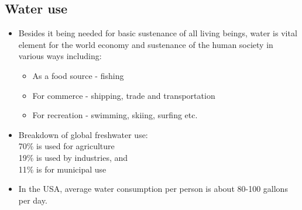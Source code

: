 \subsection{Water use}
\begin{itemize}
\item Besides it being needed for basic sustenance of all living beings, water is vital element for the world economy and sustenance of the human society in various ways including:
\begin{itemize}
\item As a food source - fishing
\item For commerce - shipping, trade and transportation
\item For recreation - swimming, skiing, surfing etc.
\end{itemize}
\item Breakdown of global freshwater use:\\
70\% is used for agriculture\\
19\% is used by industries, and \\
11\% is for municipal use

\item In the USA, average water consumption per person is about 80-100 gallons per day.

\end{itemize}

